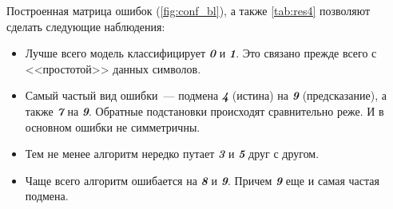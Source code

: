 \documentclass[12pt]{article}
\begin{document}

Построенная матрица ошибок (\autoref{fig:conf_bl}), а также \autoref{tab:res4} позволяют сделать следующие наблюдения:
\begin{itemize}
    \item Лучше всего модель классифицирует \textit{\textbf{0}} и \textit{\textbf{1}}. Это связано прежде всего с <<простотой>> данных символов.
    \item Самый частый вид ошибки~--- подмена \textit{\textbf{4}} (истина) на \textit{\textbf{9}} (предсказание), а также \textit{\textbf{7}} на \textit{\textbf{9}}. Обратные подстановки происходят сравнительно реже. И в основном ошибки не симметричны.
    \item Тем не менее алгоритм нередко путает \textbf{\textit{3}} и \textbf{\textit{5}} друг с другом.
    \item Чаще всего алгоритм ошибается на \textit{\textbf{8}} и \textit{\textbf{9}}. Причем \textit{\textbf{9}} еще и самая частая подмена.
\end{itemize}
\end{document}
